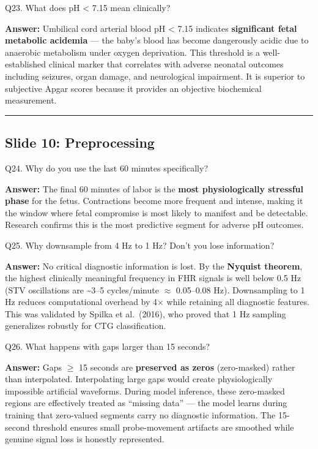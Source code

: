 \documentclass[11pt,a4paper]{article}
\begin{document}
\begin{questionbox}
Q23. What does pH \textless{} 7.15 mean clinically?
\end{questionbox}
\textbf{Answer:} Umbilical cord arterial blood pH \textless{} 7.15 indicates
\textbf{significant fetal metabolic acidemia} --- the baby's blood has
become dangerously acidic due to anaerobic metabolism under oxygen
deprivation. This threshold is a well-established clinical marker that
correlates with adverse neonatal outcomes including seizures, organ
damage, and neurological impairment. It is superior to subjective Apgar
scores because it provides an objective biochemical measurement.

\begin{center}\rule{0.5\linewidth}{0.5pt}\end{center}

\subsection{Slide 10: Preprocessing}\label{slide-10-preprocessing}

\begin{questionbox}
Q24. Why do you use the last 60 minutes specifically?
\end{questionbox}
\textbf{Answer:} The final 60 minutes of labor is the \textbf{most
physiologically stressful phase} for the fetus. Contractions become more
frequent and intense, making it the window where fetal compromise is
most likely to manifest and be detectable. Research confirms this is the
most predictive segment for adverse pH outcomes.

\begin{questionbox}
Q25. Why downsample from 4 Hz to 1 Hz? Don't you lose
information?
\end{questionbox}
\textbf{Answer:} No critical diagnostic information is lost. By the
\textbf{Nyquist theorem}, the highest clinically meaningful frequency in
FHR signals is well below 0.5 Hz (STV oscillations are
\textasciitilde3--5 cycles/minute $\approx$ 0.05--0.08 Hz). Downsampling to 1 Hz
reduces computational overhead by 4$\times$ while retaining all diagnostic
features. This was validated by Spilka et al.~(2016), who proved that 1
Hz sampling generalizes robustly for CTG classification.

\begin{questionbox}
Q26. What happens with gaps larger than 15 seconds?
\end{questionbox}
\textbf{Answer:} Gaps $\geq$ 15 seconds are \textbf{preserved as zeros}
(zero-masked) rather than interpolated. Interpolating large gaps would
create physiologically impossible artificial waveforms. During model
inference, these zero-masked regions are effectively treated as
``missing data'' --- the model learns during training that zero-valued
segments carry no diagnostic information. The 15-second threshold
ensures small probe-movement artifacts are smoothed while genuine signal
loss is honestly represented.
\end{document}
